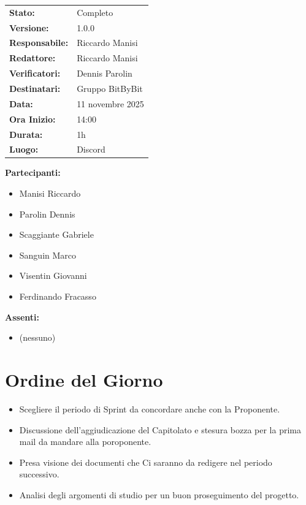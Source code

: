 \documentclass[a4paper,12pt]{article}
\begin{document}
\begin{tcolorbox}
\begin{tabularx}{\textwidth}{@{}l X@{}}
\textbf{Stato:} & Completo\\
\textbf{Versione:} & 1.0.0\\
\textbf{Responsabile:} & Riccardo Manisi\\
\textbf{Redattore:} & Riccardo Manisi \\
\textbf{Verificatori:} & Dennis Parolin\\
\textbf{Destinatari:} & Gruppo BitByBit\\
\textbf{Data:} & 11 novembre 2025 \\
\textbf{Ora Inizio:} & 14:00 \\
\textbf{Durata:} & 1h \\
\textbf{Luogo:} & Discord \\
\end{tabularx}
\end{tcolorbox}

\vspace{0.4cm}
\textbf{Partecipanti:}
\begin{itemize}
    \item Manisi Riccardo
    \item Parolin Dennis
    \item Scaggiante Gabriele
    \item Sanguin Marco
    \item Visentin Giovanni
    \item Ferdinando Fracasso
\end{itemize}

\textbf{Assenti:}
\begin{itemize}
    \item (nessuno)
\end{itemize}

\clearpage

\vspace{0.5cm}

\vspace{0.8cm}

\clearpage
\tableofcontents
\thispagestyle{empty} %
\clearpage

\section{Ordine del Giorno}
\begin{itemize}
    \item Scegliere il periodo di Sprint da concordare anche con la Proponente.
    \item Discussione dell'aggiudicazione del Capitolato e stesura bozza per la prima mail da mandare alla poroponente.
    \item Presa visione dei documenti che Ci saranno da redigere nel periodo successivo.
    \item Analisi degli argomenti di studio per un buon proseguimento del progetto.
\end{itemize}
\end{document}
